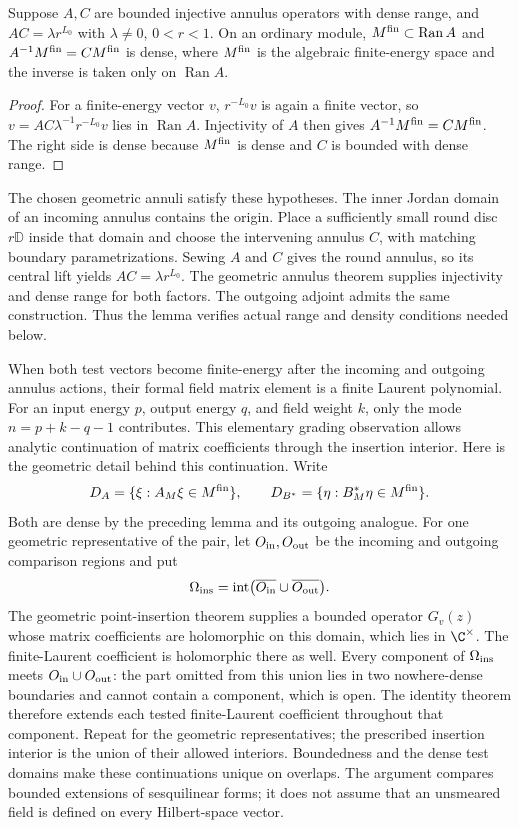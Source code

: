 \begin{lemma}
\label{lem:unitarity-annulus-domain}
Suppose $A,C$ are bounded injective annulus operators with dense
range, and $AC=\lambda r^{L_0}$ with $\lambda\ne0$, $0<r<1$.
On an ordinary module,
$M^{\rm fin}\subset\operatorname{Ran}A$ and
$A^{-1}M^{\rm fin}=CM^{\rm fin}$ is dense, where
$M^{\rm fin}$ is the algebraic finite-energy space and the
inverse is taken only on $\operatorname{Ran}A$.
\end{lemma}
\begin{proof}
For a finite-energy vector $v$, $r^{-L_0}v$ is again a finite
vector, so $v=AC\lambda^{-1}r^{-L_0}v$ lies in $\operatorname{Ran}A$.
Injectivity of $A$ then gives
$A^{-1}M^{\rm fin}=CM^{\rm fin}$. The right side is dense because
$M^{\rm fin}$ is dense and $C$ is bounded with dense range.
\end{proof}

The chosen geometric annuli satisfy these hypotheses. The
inner Jordan domain of an incoming annulus contains the origin.
Place a sufficiently small round disc $r\mathbb D$ inside that
domain and choose the intervening annulus $C$, with matching
boundary parametrizations. Sewing $A$ and $C$ gives the round
annulus, so its central lift yields $AC=\lambda r^{L_0}$.
The geometric annulus theorem supplies injectivity and dense
range for both factors. The outgoing adjoint admits the same
construction. Thus the lemma verifies actual range and density
conditions needed below.

When both test vectors become finite-energy after the incoming
and outgoing annulus actions, their formal field matrix element is
a finite Laurent polynomial. For an input energy $p$, output
energy $q$, and field weight $k$, only the mode
$n=p+k-q-1$ contributes. This elementary grading observation allows
analytic continuation of matrix coefficients through the insertion
interior. Here is the geometric detail behind this continuation.
Write
\[
 D_A=\{\xi:A_M\xi\in M^{\rm fin}\},\qquad
 D_{B^*}=\{\eta:B_M^*\eta\in M^{\rm fin}\}.
\]
Both are dense by the preceding lemma and its outgoing analogue.
For one geometric representative of the pair, let
$O_{\rm in},O_{\rm out}$ be the incoming and outgoing comparison
regions and put
\[
\Omega_{\rm ins}=\operatorname{int}
   \bigl(\overline{O_{\rm in}}\cup\overline{O_{\rm out}}\bigr).
\]
The geometric point-insertion theorem supplies a bounded operator
$G_v(z)$ whose matrix coefficients are holomorphic on this
domain, which lies in $\C^\times$. The finite-Laurent
coefficient is holomorphic there as well.
Every component of $\Omega_{\rm ins}$ meets
$O_{\rm in}\cup O_{\rm out}$: the part omitted from this union
lies in two nowhere-dense boundaries and cannot contain a component,
which is open. The identity theorem therefore extends each tested
finite-Laurent coefficient throughout that component. Repeat for
the geometric representatives; the prescribed insertion interior
is the union of their allowed interiors. Boundedness and the dense test domains make
these continuations unique on overlaps. The argument compares
bounded extensions of sesquilinear forms; it does not assume that
an unsmeared field is defined on every Hilbert-space vector.

